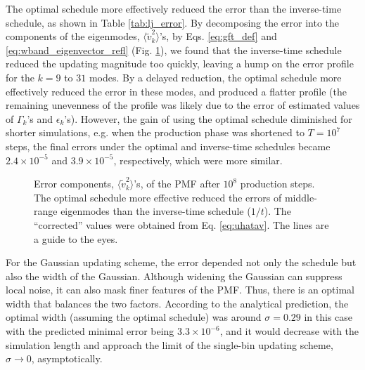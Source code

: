 \documentclass[reprint, superscriptaddress, floatfix]{revtex4-1}
\begin{document}
The optimal schedule more effectively reduced
the error than the inverse-time schedule,
as shown in Table \ref{tab:lj_error}.
%
By decomposing the error
into the components of the eigenmodes,
$\langle \tilde v_k^2 \rangle$'s,
by Eqs. \eqref{eq:gft_def} and \eqref{eq:wband_eigenvector_refl}
(Fig. \ref{fig:lj_xerr}),
we found that the inverse-time schedule
reduced the updating magnitude too quickly,
leaving a hump on the error profile
for the $k = 9$ to $31$ modes.
%
By a delayed reduction,
the optimal schedule more effectively reduced
the error in these modes,
and produced a flatter profile
(the remaining unevenness of the profile
was likely due to the error of estimated values of
$\Gamma_k$'s and $\epsilon_k$'s).
%
However, the gain of using the optimal schedule
diminished for shorter simulations,
e.g. when the production phase was shortened to $T = 10^7$ steps,
the final errors under the optimal and inverse-time schedules
became $2.4\times 10^{-5}$ and $3.9\times 10^{-5}$, respectively,
which were more similar.

\begin{figure}[h]\centering
  \caption{
    \label{fig:lj_xerr}
    Error components,
    $\langle \tilde v_k^2 \rangle$'s,
    of the PMF after $10^8$ production steps.
    The optimal schedule more effective
    reduced the errors of middle-range eigenmodes
    than the inverse-time schedule ($1/t$).
    The ``corrected'' values were obtained from
    Eq. \eqref{eq:uhatav}.
    The lines are a guide to the eyes.
  }
\end{figure}


For the Gaussian updating scheme,
the error depended not only the schedule
but also the width of the Gaussian.
%
Although widening the Gaussian
can suppress local noise,
it can also mask finer features of the PMF.
%
Thus, there is an optimal width that balances the two factors.
%
According to the analytical prediction,
the optimal width (assuming the optimal schedule)
was around $\sigma = 0.29$ in this case
with the predicted minimal error being $3.3\times 10^{-6}$,
and it would decrease with the simulation length
and approach the limit of the single-bin updating scheme,
$\sigma \to 0$, asymptotically.
\end{document}
